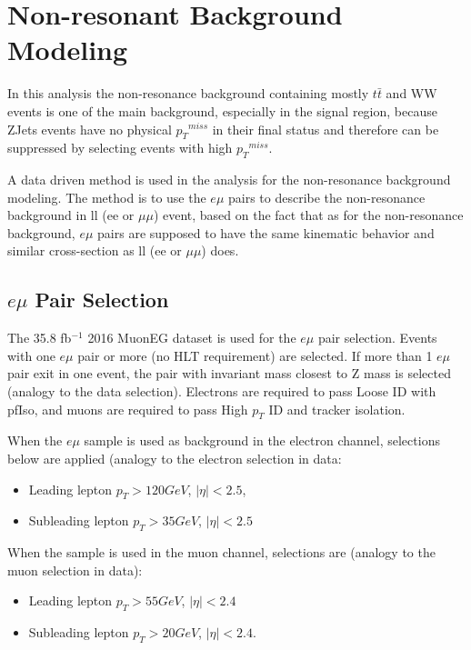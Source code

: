 \clearpage
\section{Non-resonant Background Modeling}
In this analysis the non-resonance background containing mostly $t\bar{t}$ and WW events is one of the main background, especially in the signal region, because ZJets events have no physical ${p_{T}}^{miss}$ in their final status and therefore can be suppressed by selecting events with high ${p_{T}}^{miss}$. 

\vspace{0.3cm}
A data driven method is used in the analysis for the non-resonance background modeling. The method is to use the $e\mu$ pairs to describe the non-resonance background in ll (ee or $\mu \mu$) event, based on the fact that as for the non-resonance background, $e\mu$ pairs are supposed to have the same kinematic behavior and similar cross-section as ll (ee or $\mu \mu$) does.

\subsection{$e\mu$ Pair Selection}
The 35.8 fb$^{-1}$ 2016 MuonEG dataset is used for the $e\mu$ pair selection.  Events with one $e\mu$ pair or more (no HLT requirement) are selected. If more than 1 $e\mu$ pair exit in one event, the pair with invariant mass closest to Z mass is selected (analogy to the data selection). Electrons are required to pass Loose ID with pfIso, and muons are required to pass High $p_T$ ID and tracker isolation. 

\vspace{0.3cm}
When the $e\mu$ sample is used as background in the electron channel, selections below are applied (analogy to the electron selection in data: 
\begin{itemize}
\item Leading lepton $p_{T}>120GeV$, $|\eta|<2.5$, 
\item Subleading lepton $p_{T}>35GeV$, $|\eta|<2.5$
\end{itemize}
When the sample is used in the muon channel, selections are (analogy to the muon selection in data): 
\begin{itemize}
\item Leading lepton $p_{T}>55GeV$, $|\eta|<2.4$
\item Subleading lepton $p_{T}>20GeV$, $|\eta|<2.4$. 
\end{itemize}

